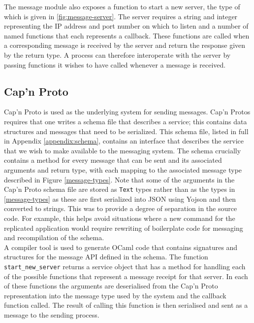 The message module also exposes a function to start a new server, the type of which is given in \ref{fig:message-server}. The server requires a string and integer representing the IP address and port number on which to listen and a number of named functions that each represents a callback. These functions are called when a corresponding message is received by the server and return the response given by the return type. A process can therefore interoperate with the server by passing functions it wishes to have called whenever a message is received. \\

\subsection{Cap'n Proto}

Cap'n Proto is used as the underlying system for sending messages. Cap'n Protos requires that one writes a schema file that describes a service; this contains data structures and messages that need to be serialized. This schema file, listed in full in Appendix \ref{appendix:schema}, contains an interface that describes the service that we wish to make available to the messaging system. The schema crucially contains a method for every message that can be sent and its associated arguments and return type, with each mapping to the associated message type described in Figure \ref{message-types}. Note that some of the arguments in the Cap'n Proto schema file are stored as \texttt{Text} types rather than as the types in \ref{message-types} as these are first serialized into JSON using Yojson and then converted to strings. This was to provide a degree of separation in the source code. For example, this helps avoid situations where a new command for the replicated application would require rewriting of boilerplate code for messaging and recompilation of the schema. \\

A compiler tool is used to generate OCaml code that contains signatures and structures for the message API defined in the schema. The function \texttt{start\_new\_server} returns a service object that has a method for handling each of the possible functions that represent a message receipt for that server. In each of these functions the arguments are deserialised from the Cap'n Proto representation into the message type used by the system and the callback function called. The result of calling this function is then serialised and sent as a message to the sending process. \\

